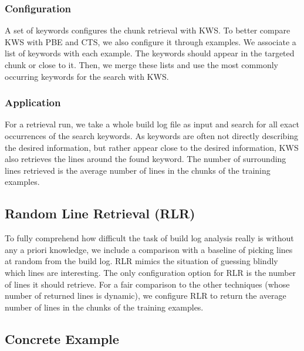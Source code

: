 \subsubsection{Configuration}
A set of keywords configures the chunk retrieval with KWS\@.
To better
compare KWS with PBE and CTS, we also configure it through examples.
We associate a list of keywords with each example.
The keywords should appear in the targeted
chunk or close to it.
Then, we merge these lists and use the most commonly occurring
keywords for the search with KWS.

\subsubsection{Application}
For a retrieval run, we take a whole build log file as input and
search for all exact occurrences of the search keywords.
As keywords are
often not directly describing the desired information, but rather
appear close to the desired information, KWS also retrieves the lines
around the found keyword.
The number of surrounding lines retrieved is
the average number of lines in the chunks of the training examples.

\subsection{Random Line Retrieval (RLR)}
\label{sec:expl-rlr}
To fully comprehend how difficult the task of build log analysis really
is without any a priori knowledge, we include a comparison with a
baseline of
picking lines at random from the build log.
RLR mimics the
situation of guessing blindly which lines are interesting.
The only configuration option for RLR is the number of lines it should
retrieve.
For a fair comparison to the other techniques (whose number of
returned lines is dynamic), we configure RLR to return the average
number of lines in the chunks of the training examples.

\subsection{Concrete Example}
\label{sec:crt-example}

